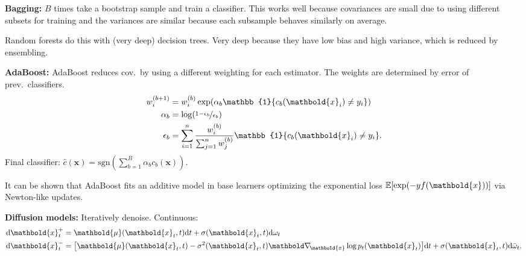 \documentclass[9pt]{extarticle}
\newenvironment{topic}[1]
{\textbf{\sffamily \colorbox{black}{\rlap{\textbf{\textcolor{white}{#1}}}\hspace{\linewidth}\hspace{-2\fboxsep}}}}
{}
\newenvironment{subtopic}[1]
{\textbf{\sffamily #1:}}
{}
\renewcommand{\vec}[1]{\ensuremath{\mathbold{#1}}}
\begin{document}
\begin{multicols*}{3}
\begin{topic}{Ensembles}
        \begin{subtopic}{Bagging}
            $B$ times take a bootstrap sample and train a classifier. This works well because
            covariances are small due to using different subsets for training and the variances are
            similar because each subsample behaves similarly on average.

            Random forests do this with (very deep) decision trees. Very deep because they have low bias and
            high variance, which is reduced by ensembling.

        \end{subtopic}

        \begin{subtopic}{AdaBoost}
            AdaBoost reduces cov.\ by using a different weighting for each estimator. The weights are
            determined by error of prev.\ classifiers.
            \begin{align*}
                w_i^{(b+1)} & = w_i^{(b)} \exp(\alpha_b \mathbb{1}\{ c_b(\vec{x}_i) \neq y_i \})                                   \\
                \alpha_b    & = \log \lft( \nicefrac{1-\epsilon_b}{\epsilon_b} \rgt)                                               \\
                \epsilon_b  & = \sum_{i=1}^{n} \frac{w_i^{(b)}}{\sum_{j=1}^{n} w_j^{(b)}} \mathbb{1}\{ c_b(\vec{x}_i) \neq y_i \}.
            \end{align*}
            Final classifier: $\hat{c}(\vec{x}) = \mathrm{sgn}(\sum_{b=1}^{B} \alpha_b c_b(\vec{x}))$.

            It can be shown that AdaBoost fits an additive model in base learners optimizing the exponential
            loss $\E[\exp(-yf(\vec{x}))]$ via Newton-like updates.

        \end{subtopic}

    \end{topic}

    \begin{topic}{Stable diffusion}

        \begin{subtopic}{Diffusion models}
            Iteratively denoise. Continuous:
            {\footnotesize \begin{align*}
                \mathrm{d}\vec{x}^+_t & = \vec{\mu}(\vec{x}_t, t) \mathrm{d}t + \sigma(\vec{x}_t, t) \mathrm{d}\omega_t                                                                                 \\
                \mathrm{d}\vec{x}^-_t & = \lft[ \vec{\mu}(\vec{x}_t, t) - \sigma^2(\vec{x}_t, t) \grad{\log p_t(\vec{x}_t)}{\vec{x}} \rgt] \mathrm{d}t + \sigma(\vec{x}_t, t) \mathrm{d}\bar{\omega}_t.
            \end{align*}}


\end{subtopic}
\end{topic}
\end{multicols*}
\end{document}
